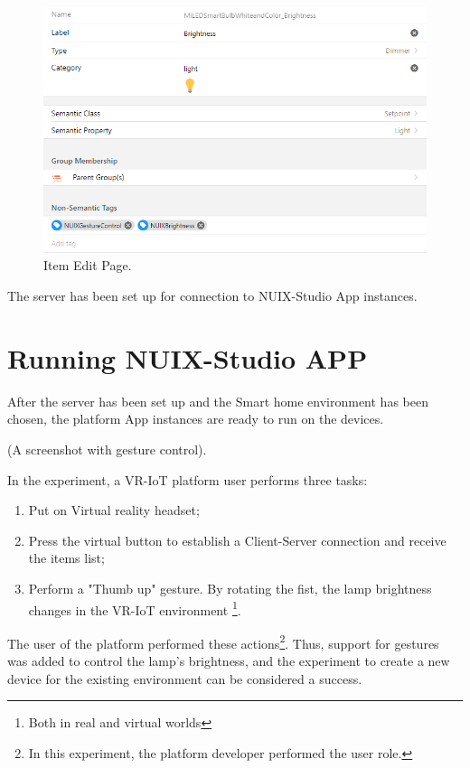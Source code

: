 \begin{figure}
  \centering
  \includegraphics[width = 0.9 \linewidth]{figures/ItemEditPage.png}
  \caption{Item Edit Page.}
  \label{fig:ItemEditPage-figure}
\end{figure}

The server has been set up for connection to NUIX-Studio App instances.

\section{Running NUIX-Studio APP}

After the server has been set up and the Smart home environment has been chosen, the platform App instances are ready to run on the devices.

(A screenshot with gesture control).

In the experiment, a VR-IoT platform user performs three tasks:
\begin{enumerate}
    \item Put on Virtual reality headset;
    \item Press the virtual button to establish a Client-Server connection and receive the items list;
    \item Perform a "Thumb up" gesture. By rotating the fist, the lamp brightness changes in the VR-IoT environment \footnote{Both in real and virtual worlds}.
\end{enumerate}

The user of the platform performed these actions\footnote{In this experiment, the platform developer performed the user role.}. Thus, support for gestures was added to control the lamp's brightness, and the experiment to create a new device for the existing environment can be considered a success.

